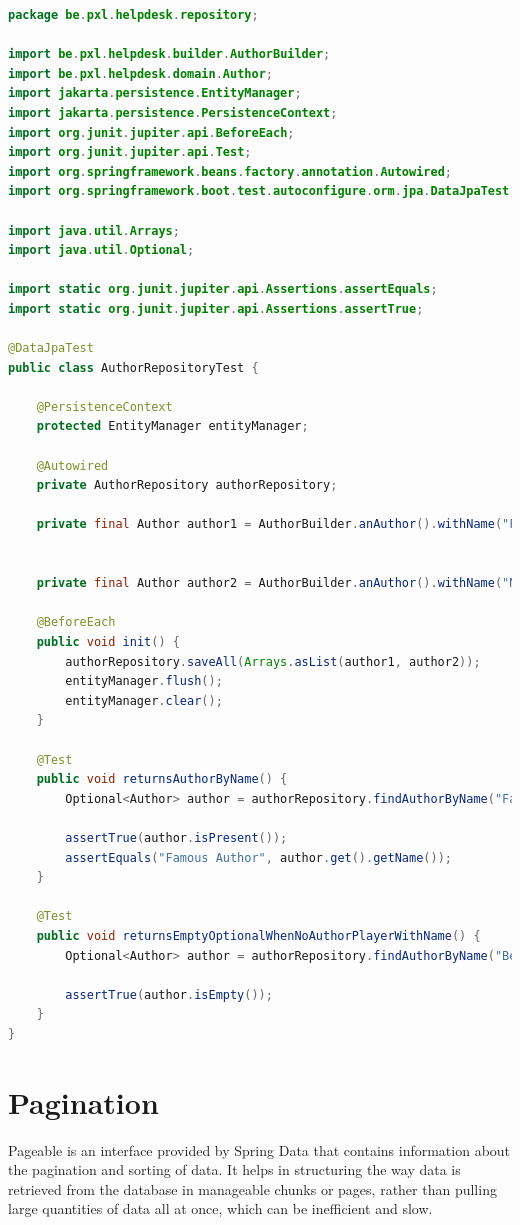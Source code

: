 \begin{lstlisting}[frame=single, language=java]
package be.pxl.helpdesk.repository;

import be.pxl.helpdesk.builder.AuthorBuilder;
import be.pxl.helpdesk.domain.Author;
import jakarta.persistence.EntityManager;
import jakarta.persistence.PersistenceContext;
import org.junit.jupiter.api.BeforeEach;
import org.junit.jupiter.api.Test;
import org.springframework.beans.factory.annotation.Autowired;
import org.springframework.boot.test.autoconfigure.orm.jpa.DataJpaTest;

import java.util.Arrays;
import java.util.Optional;

import static org.junit.jupiter.api.Assertions.assertEquals;
import static org.junit.jupiter.api.Assertions.assertTrue;

@DataJpaTest
public class AuthorRepositoryTest {

	@PersistenceContext
	protected EntityManager entityManager;

	@Autowired
	private AuthorRepository authorRepository;

	private final Author author1 = AuthorBuilder.anAuthor().withName("Famous Author").build();


	private final Author author2 = AuthorBuilder.anAuthor().withName("Not So Famous Author").build();

	@BeforeEach
	public void init() {
		authorRepository.saveAll(Arrays.asList(author1, author2));
		entityManager.flush();
		entityManager.clear();
	}

	@Test
	public void returnsAuthorByName() {
		Optional<Author> author = authorRepository.findAuthorByName("Famous Author");

		assertTrue(author.isPresent());
		assertEquals("Famous Author", author.get().getName());
	}

	@Test
	public void returnsEmptyOptionalWhenNoAuthorPlayerWithName() {
		Optional<Author> author = authorRepository.findAuthorByName("Bestseller Author");

		assertTrue(author.isEmpty());
	}
}
\end{lstlisting}


\section{Pagination}

Pageable is an interface provided by Spring Data that contains information about the pagination and sorting of data. It helps in structuring the way data is retrieved from the database in manageable chunks or pages, rather than pulling large quantities of data all at once, which can be inefficient and slow.


